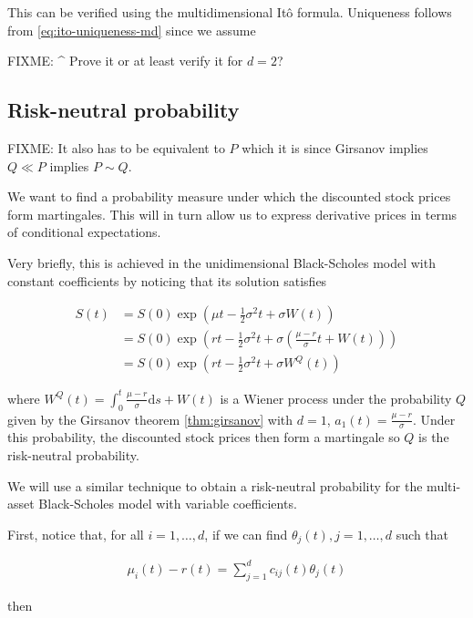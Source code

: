 \documentclass[a4paper]{article}
\begin{document}
This can be verified using the multidimensional It\^o formula. Uniqueness follows from \eqref{eq:ito-uniqueness-md} since we assume

FIXME: \^{} Prove it or at least verify it for $d=2$?

\pagebreak
\subsection{Risk-neutral probability}

FIXME: It also has to be equivalent to $P$ which it is since Girsanov implies $Q \ll P$ implies $P \sim Q$.

We want to find a probability measure under which the discounted stock prices form martingales. This will in turn allow us to express derivative prices in terms of conditional expectations.

Very briefly, this is achieved in the unidimensional Black-Scholes model with constant coefficients by noticing that its solution satisfies

\begin{align*}
  S(t)
  &= S(0) \exp \left( \mu t - \frac{1}{2} \sigma^2 t + \sigma W(t) \right)\\
  &= S(0) \exp \left( r t - \frac{1}{2} \sigma^2 t + \sigma \left( \frac{\mu - r}{\sigma} t + W(t) \right) \right)\\
  &= S(0) \exp \left( r t - \frac{1}{2} \sigma^2 t + \sigma W^Q(t) \right)
\end{align*}

where $W^Q(t) = \int_0^t \frac{\mu-r}{\sigma} \mathrm{d}s + W(t)$ is a Wiener process under the probability $Q$ given by the Girsanov theorem \eqref{thm:girsanov} with $d=1$, $a_1(t) = \frac{\mu - r}{\sigma}$. Under this probability, the discounted stock prices then form a martingale so $Q$ is the risk-neutral probability.

We will use a similar technique to obtain a risk-neutral probability for the multi-asset Black-Scholes model with variable coefficients.

First, notice that, for all $i=1,\ldots,d$, if we can find $\theta_j(t), j=1,\ldots,d$ such that

\begin{align}\label{eq:bs-theta}
  \mu_i(t) - r(t) = \sum_{j=1}^d c_{ij}(t) \theta_j(t)
\end{align}

then
\end{document}
